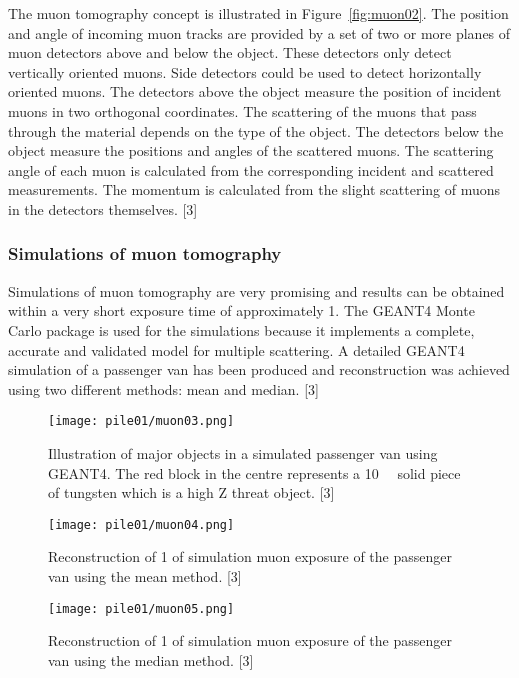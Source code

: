 \documentclass[twoside,titlepage,11pt,twocolumn,a4paper]{article}
\begin{document}
The muon tomography concept is illustrated in
Figure~\ref{fig:muon02}. The position and angle of incoming muon
tracks are provided by a set of two or more planes of muon detectors
above and below the object. These detectors only detect vertically
oriented muons. Side detectors could be used to detect horizontally
oriented muons. The detectors above the object measure the position of
incident muons in two orthogonal coordinates. The scattering of the
muons that pass through the material depends on the type of the
object. The detectors below the object measure the positions and
angles of the scattered muons. The scattering angle of each muon is
calculated from the corresponding incident and scattered
measurements. The momentum is calculated from the slight scattering of
muons in the detectors themselves. [3]

\subsubsection{Simulations of muon tomography}
Simulations of muon tomography are very promising and results can be
obtained within a very short exposure time of approximately
\unit{1}{\minute}. The GEANT4 Monte Carlo package is used for the
simulations because it implements a complete, accurate and validated
model for multiple scattering. A detailed GEANT4 simulation of a
passenger van has been produced and reconstruction was achieved using
two different methods: mean and median. [3]

\begin{figure}
  \texttt{[image: pile01/muon03.png]}
  \caption{Illustration of major objects in a simulated passenger van
    using GEANT4. The red block in the centre represents a
    \unit{10}{\cubic{\centi\metre}} solid piece of
    tungsten which is a high Z threat object. [3]}
\end{figure}
\begin{figure}
  \texttt{[image: pile01/muon04.png]}
  \caption{Reconstruction of \unit{1}{\minute} of simulation muon
    exposure of the passenger van using the mean method. [3]}
  \label{fig:muon04}
\end{figure}
\begin{figure}
  \texttt{[image: pile01/muon05.png]}
  \caption{Reconstruction of \unit{1}{\minute} of simulation muon
    exposure of the passenger van using the median method. [3]}
  \label{fig:muon05}
\end{figure}
\end{document}
